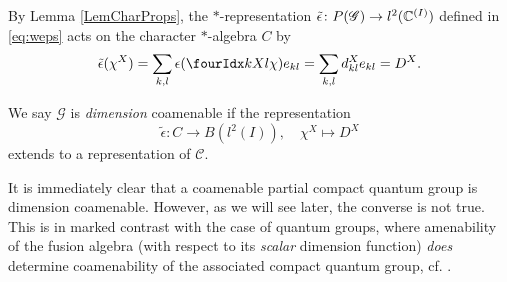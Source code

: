 By Lemma \ref{LemCharProps}, the $*$-representation $\operatorname{\tilde{\epsilon}} \colon P(\mathscr{G})
\to l^{2}(\mathbb{C}^{(I)})$ defined in
\eqref{eq:weps}  acts on the character $*$-algebra $C$ by
\begin{align*}
  \weps(\chi^{X}) = \sum_{k,l} \epsilon(\Gr{\chi}{}{X}{k}{l})e_{kl} =
  \sum_{k,l} d^{X}_{kl} e_{kl} =D^{X}.
\end{align*}



\begin{Def} We say $\mathscr{G}$ is \emph{dimension} coamenable %
if the representation \[\tilde{\epsilon}: C \rightarrow B(l^2(I)), \quad \chi^X \mapsto D^X\] extends to a representation of $\mathcal{C}$.
\end{Def}

It is immediately clear that a coamenable partial compact quantum group is dimension coamenable. However, as we will see later, the converse is not true. This is in marked contrast with the case of quantum groups, where amenability of the fusion algebra (with respect to its \emph{scalar} dimension function) \emph{does} determine coamenability of the associated compact quantum group, cf. \cite[Theorem 4.5]{Kye1}.
 


